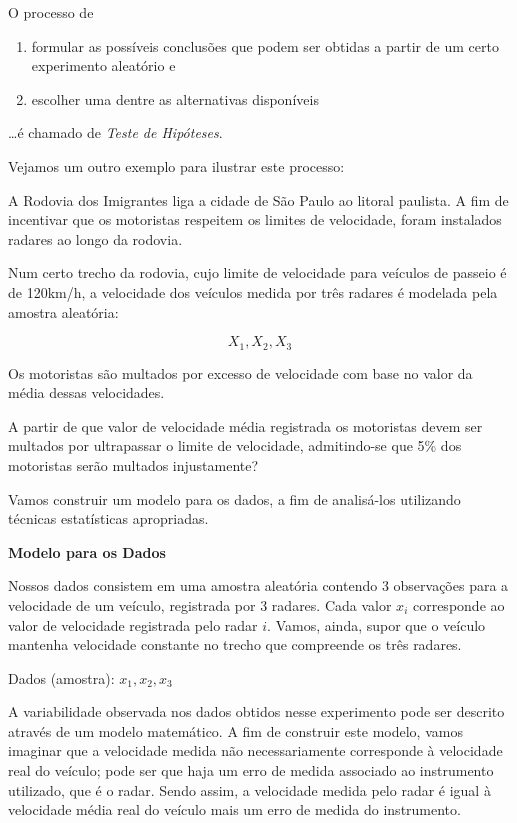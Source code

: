 \documentclass[
]{book}
\providecommand{\tightlist}{%
  \setlength{\itemsep}{0pt}\setlength{\parskip}{0pt}}
\theoremstyle{definition}
\theoremstyle{definition}
\theoremstyle{definition}
\theoremstyle{remark}
\begin{document}
O processo de

\begin{enumerate}
\def\labelenumi{(\roman{enumi})}
\tightlist
\item
  formular as possíveis conclusões que podem ser obtidas a partir de um certo
  experimento aleatório e\\
\item
  escolher uma dentre as alternativas disponíveis
\end{enumerate}

\ldots é chamado de \emph{Teste de Hipóteses}.

Vejamos um outro exemplo para ilustrar este processo:

A Rodovia dos Imigrantes liga a cidade de São Paulo ao litoral paulista. A fim de incentivar que os motoristas respeitem os limites de velocidade, foram instalados radares ao longo da rodovia.

Num certo trecho da rodovia, cujo limite de velocidade para veículos de passeio é de 120km/h,
a velocidade dos veículos medida por três radares é modelada pela amostra aleatória:

\[X_1, X_2, X_3\]

Os motoristas são multados por excesso de velocidade com base no valor da média dessas velocidades.

A partir de que valor de velocidade média registrada os motoristas devem ser multados por ultrapassar o limite de velocidade, admitindo-se que 5\% dos motoristas serão multados injustamente?

Vamos construir um modelo para os dados, a fim de analisá-los utilizando técnicas estatísticas apropriadas.

\textbf{Modelo para os Dados}

Nossos dados consistem em uma amostra aleatória contendo 3 observações para a velocidade de um veículo, registrada por 3 radares. Cada valor \(x_i\) corresponde ao valor de velocidade registrada pelo radar \(i\). Vamos, ainda, supor que o veículo mantenha velocidade constante no trecho que compreende os três radares.

Dados (amostra): \(x_1, x_2, x_3\)

A variabilidade observada nos dados obtidos nesse experimento pode ser descrito através de um modelo matemático. A fim de construir este modelo, vamos imaginar que a velocidade medida não necessariamente corresponde à velocidade real do veículo; pode ser que haja um erro de medida associado ao instrumento utilizado, que é o radar.
Sendo assim, a velocidade medida pelo radar é igual à velocidade média real do veículo mais um erro de medida do instrumento.
\end{document}
